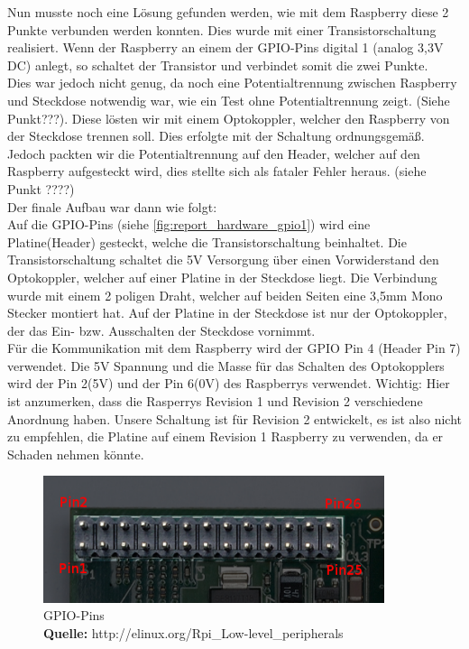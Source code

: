 Nun musste noch eine Lösung gefunden werden, wie mit dem Raspberry diese 2 Punkte verbunden werden konnten. Dies wurde mit einer Transistorschaltung realisiert. Wenn der Raspberry an einem der GPIO-Pins digital 1 (analog 3,3V DC) anlegt, so schaltet der Transistor und verbindet somit die zwei Punkte. \\
Dies war jedoch nicht genug, da noch eine Potentialtrennung zwischen Raspberry und Steckdose  notwendig war, wie ein Test ohne Potentialtrennung zeigt. (Siehe Punkt???). Diese lösten wir mit einem Optokoppler, welcher den Raspberry von der Steckdose trennen soll. Dies erfolgte mit der Schaltung ordnungsgemäß. Jedoch packten wir die Potentialtrennung auf den Header, welcher auf den Raspberry aufgesteckt wird, dies stellte sich als fataler Fehler heraus. (siehe Punkt ????)\\
Der finale Aufbau war dann wie folgt:\\
Auf die GPIO-Pins (siehe \autoref{fig:report_hardware_gpio1}) wird eine Platine(Header) gesteckt, welche die Transistorschaltung beinhaltet. Die Transistorschaltung schaltet die 5V Versorgung über einen Vorwiderstand den Optokoppler, welcher auf einer Platine in der Steckdose liegt. Die Verbindung wurde mit einem 2 poligen Draht, welcher auf beiden Seiten eine 3,5mm Mono Stecker montiert hat. Auf der Platine in der Steckdose ist nur der Optokoppler, der das Ein- bzw. Ausschalten der Steckdose vornimmt.\\
Für die Kommunikation mit dem Raspberry wird der GPIO Pin 4 (Header Pin 7) verwendet. Die 5V Spannung und die Masse für das Schalten des Optokopplers wird der Pin 2(5V) und der Pin 6(0V) des Raspberrys verwendet. Wichtig: Hier ist anzumerken, dass die Rasperrys Revision 1 und Revision 2 verschiedene Anordnung haben. Unsere Schaltung ist für Revision 2 entwickelt, es ist also nicht zu empfehlen, die Platine auf einem Revision 1 Raspberry zu verwenden, da er Schaden nehmen könnte.
\\
\begin{figure}[H]
\centering
\includegraphics[keepaspectratio=true, width=10cm]{images/rpi/picPins.png}
\caption[GPIO-Pins]{GPIO-Pins\\ \textbf{Quelle:} http://elinux.org/Rpi\_Low-level\_peripherals}
\label{fig:report_hardware_gpio1}
\end{figure}
